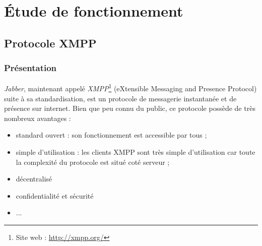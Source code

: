 \cleardoublepage



\chapter{Étude de fonctionnement}


\section{Protocole XMPP}


\subsection{Présentation}

\textit{Jabber}, maintenant appelé \textit{XMPP}\footnote{Site web : \href{http://xmpp.org/}{http://xmpp.org/}} (eXtensible Messaging and Presence Protocol) suite à sa standardisation, est un protocole de messagerie instantanée et de présence sur internet.
Bien que peu connu du public, ce protocole possède de très nombreux avantages :
\begin{itemize}
	\item standard ouvert : son fonctionnement est accessible par tous ;
	\item simple d'utilisation : les clients XMPP sont très simple d'utilisation car toute la complexité du protocole est situé coté serveur ;
	\item décentralisé
	\item confidentialité et sécurité
	\item ...
\\
\end{itemize}

